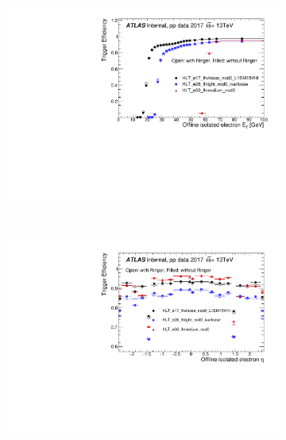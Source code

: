 \begin{figure}[h!tb]
  \begin{center}
  \begin{subfigure}[c]{.58\textwidth}
  \centering
  \includegraphics[width=\textwidth]{sections/04_operation/figures/efficiencies/eff_EGAM1_e17_e26_e60_2017_before_and_after_ts1_et.pdf}
  \caption{}%
  \end{subfigure}\\
  \begin{subfigure}[c]{.58\textwidth}
  \centering
  \includegraphics[width=\textwidth]{sections/04_operation/figures/efficiencies/eff_EGAM1_e17_e26_e60_2017_before_and_after_ts1_eta.pdf}
  \caption{}%
  \end{subfigure} \\

\end{center}
\end{figure}
